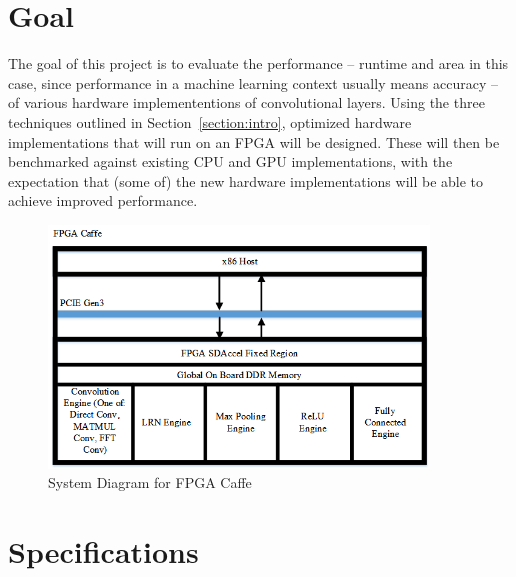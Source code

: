 \documentclass[conference,compsoc]{IEEEtran/IEEEtran}
\begin{document}
\section{Goal}\label{section:goal}

The goal of this project is to evaluate the performance -- runtime and area in this case, since performance in a machine learning context usually means accuracy -- of various hardware implemententions of convolutional layers.
Using the three techniques outlined in Section~\ref{section:intro}, optimized hardware implementations that will run on an FPGA will be designed.
These will then be benchmarked against existing CPU and GPU implementations, with the expectation that (some of) the new hardware implementations will be able to achieve improved performance.

\begin{figure}[ht]
    \centering
    \includegraphics[width=0.9\textwidth]{system_diagram.png}
    \caption{System Diagram for FPGA Caffe}
    \label{fig:system_diag}
\end{figure}

\section{Specifications}\label{section:spec}
\end{document}

